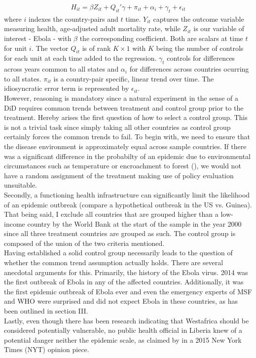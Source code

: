 \documentclass{article}
\begin{document}
\begin{align}
H_{it} =  \beta Z_{it} +  Q_{it}'\gamma + \pi_{it} + \alpha_i + \gamma_t + \epsilon_{it}
\end{align}
where $i$ indexes the country-pairs and $t$ time. $Y_{it}$ captures the outcome variable measuring health, age-adjusted adult mortality rate, while $Z_{it}$ is our variable of interest - Ebola - with $\beta$ the corresponding coefficient. Both are scalars at time $t$ for unit $i$. The vector $Q_{it}$ is of rank $K \times 1$ with $K$ being the number of controls for each unit at each time added to the regression. $\gamma_t$ controls for differences across years common to all states and $\alpha_i$ for differences across countries ocurring to all states. $\pi_{it}$ is a country-pair specific, linear trend over time. The idiosyncratic error term is represented by $\epsilon_{it}$. \\
However, reasoning is mandatory since a natural experiment in the sense of a DiD requires common trends between treatment and control group prior to the treatment. Hereby arises the first question of how to select a control group. This is not a trivial task since simply taking all other countries as control group certainly forces the common trends to fail. To begin with, we need to ensure that the disease environment is approximately equal across sample countries. If there was a significant difference in the probabilty of an epidemic due to environmental circumstances such as temperature or encroachment to forest (\cite{alexander2015factors}), we would not have a random assignment of the treatment making use of policy evaluation unsuitable.\\
Secondly, a functioning health infrastructure can significantly limit the likelihood of an epidemic outbreak (compare a hypothetical outbreak in the US vs. Guinea). That being said, I exclude all countries that are grouped higher than a low-income country by the World Bank at the start of the sample in the year 2000 since all three treatment countries are grouped as such. The control group is composed of the union of the two criteria mentioned.\\
Having established a solid control group necessarily leads to the question of whether the common trend assumption actually holds. There are several anecdotal arguments for this. Primarily, the history of the Ebola virus. 2014 was the first outbreak of Ebola in any of the affected countries. Additionally, it was the first epidemic outbreak of Ebola ever and even the emergency experts of MSF and WHO were surprised and did not expect Ebola in these countries, as has been outlined in section III.\\
Lastly, even though there has been research indicating that Westafrica should be considered potentially vulnerable, no public health official in Liberia knew of a potential danger neither the epidemic scale, as claimed by \cite{ebola2015nyt} in a 2015 New York Times (NYT) opinion piece.
\end{document}
